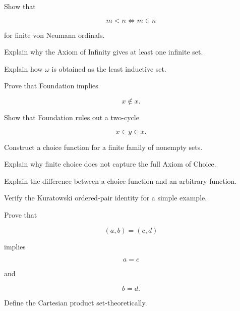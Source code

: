 \begin{exercise}[3]
Show that

\[
m<n
\iff
m\in n
\]

for finite von Neumann ordinals.
\end{exercise}

\begin{exercise}[3]
Explain why the Axiom of Infinity gives at least one infinite set.
\end{exercise}

\begin{exercise}[3]
Explain how \(\omega\) is obtained as the least inductive set.
\end{exercise}

\begin{exercise}[3]
Prove that Foundation implies

\[
x\notin x.
\]
\end{exercise}

\begin{exercise}[3]
Show that Foundation rules out a two-cycle

\[
x\in y\in x.
\]
\end{exercise}

\begin{exercise}[2]
Construct a choice function for a finite family of nonempty sets.
\end{exercise}

\begin{exercise}[3]
Explain why finite choice does not capture the full Axiom of Choice.
\end{exercise}

\begin{exercise}[3]
Explain the difference between a choice function and an arbitrary function.
\end{exercise}

\begin{exercise}[2]
Verify the Kuratowski ordered-pair identity for a simple example.
\end{exercise}

\begin{exercise}[3]
Prove that

\[
(a,b)=(c,d)
\]

implies

\[
a=c
\]

and

\[
b=d.
\]
\end{exercise}

\begin{exercise}[2]
Define the Cartesian product set-theoretically.
\end{exercise}

